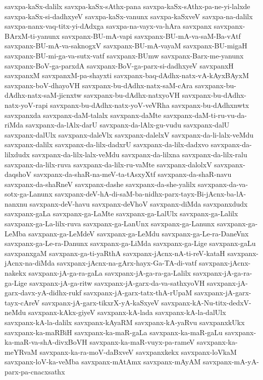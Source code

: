{savxpa-kaSx-dalilx
savxpa-kaSx-sAthx-pana
savxpa-kaSx-sAthx-pa-ne-yi-lalxde
savxpa-kaSx-si-dadhxyeV
savxpa-kaSx-vanunx
savxpa-kaSxveV
savxpa-na-dalilx
savxpa-nanx-vaq-titx-yi-dAdxga
savxpa-na-vayx-va-hAra
savxpanx
savxpanx-BArxM-ti-yanunx
savxpanx-BU-mA-vapi
savxpanx-BU-mA-va-saM-Ba-vAtf
savxpanx-BU-mA-va-saknogxV
savxpanx-BU-mA-vayaM
savxpanx-BU-migaH
savxpanx-BU-mi-ga-va-sutx-vatf
savxpanx-BUmw
savxpanx-Barx-me-yanunx
savxpanx-BoV-ga-parxdA
savxpanx-BoV-ga-parx-si-dadhxyeV
savxpanxH
savxpanxM
savxpanxM-pa-shayxti
savxpanx-baq-dAdhx-natx-vA-kAyxBAyxM
savxpanx-boV-dhayoVH
savxpanx-bu-dAdhx-natx-saM-cAra
savxpanx-bu-dAdhx-natx-saM-jicnxtw
savxpanx-bu-dAdhx-natxyoVH
savxpanx-bu-dAdhx-natx-yoV-rapi
savxpanx-bu-dAdhx-natx-yoV-veVRha
savxpanx-bu-dAdhxnwtx
savxpanxda
savxpanx-daM-talalx
savxpanx-daMte
savxpanx-daM-ti-ru-vu-da-riMda
savxpanx-da-lAlx-darU
savxpanx-da-lAlx-gu-vudu
savxpanx-dalU
savxpanx-dalUlx
savxpanx-daleVlx
savxpanx-dalelxV
savxpanx-da-li-lalx-veMdu
savxpanx-dalilx
savxpanx-da-lilx-dadxrU
savxpanx-da-lilx-dadxvo
savxpanx-da-lilxdudx
savxpanx-da-lilx-lalx-veMdu
savxpanx-da-lilxna
savxpanx-da-lilx-ralu
savxpanx-da-lilx-ruva
savxpanx-da-lilx-ru-vaMte
savxpanx-dalolxV
savxpanx-daqshoV
savxpanx-da-shaR-na-meV-ta-tAsxyXtf
savxpanx-da-shaR-navu
savxpanx-da-shaRneV
savxpanx-dashe
savxpanx-da-she-yalilx
savxpanx-da-va-sotx-ga-Lanunx
savxpanx-deV-hA-di-saM-ba-nidhx-parx-tayx-Bi-jAcnx-ba-lA-nanxnu
savxpanx-deV-havu
savxpanx-deVhoV
savxpanx-diMda
savxpanxdudx
savxpanx-gaLa
savxpanx-ga-LaMte
savxpanx-ga-LalUlx
savxpanx-ga-Lalilx
savxpanx-ga-La-lilx-ruva
savxpanx-ga-LanUnx
savxpanx-ga-Lanunx
savxpanx-ga-LeMba
savxpanx-ga-LeMdeV
savxpanx-ga-LeMdu
savxpanx-ga-Le-ra-DaneVnx
savxpanx-ga-Le-ra-Danunx
savxpanx-ga-LiMda
savxpanx-ga-Lige
savxpanx-gaLu
savxpanxgaM
savxpanx-ga-ti-yaRthA
savxpanx-jAcnx-nA-ti-reV-kataH
savxpanx-jAcnx-na-diMda
savxpanx-jAcnx-na-gArx-hayx-Ga-TA-di-vatf
savxpanx-jAcnx-nakekx
savxpanx-jA-ga-ra-gaLa
savxpanx-jA-ga-ra-ga-Lalilx
savxpanx-jA-ga-ra-ga-Lige
savxpanx-jA-ga-ritw
savxpanx-jA-garx-da-va-sathxyoVH
savxpanx-jA-garx-davx-yA-didhx-rukf
savxpanx-jA-garx-tatx-thA-rUpaM
savxpanx-jA-garx-tayx-cAreV
savxpanx-jA-garx-tikxrX-yA-kaSxyeV
savxpanx-kA-Nu-titx-dedxV-neMdu
savxpanx-kAkx-giyeV
savxpanx-kA-lada
savxpanx-kA-la-dalUlx
savxpanx-kA-la-dalilx
savxpanx-kAyaRM
savxpanx-kA-yaRvu
savxpanxkUkx
savxpanx-ka-maRBiH
savxpanx-ka-maR-gaLa
savxpanx-ka-maR-gaLu
savxpanx-ka-maR-va-shA-divxBoVH
savxpanx-ka-maR-vuyx-pa-rameV
savxpanx-ka-meYRvaM
savxpanx-ka-ra-moV-daBxveV
savxpanxkekx
savxpanx-loVkaM
savxpanx-loV-ka-veMba
savxpanx-mAtAmx
savxpanx-mAyAM
savxpanx-mA-yA-parx-pa-cnacxsathx
}
